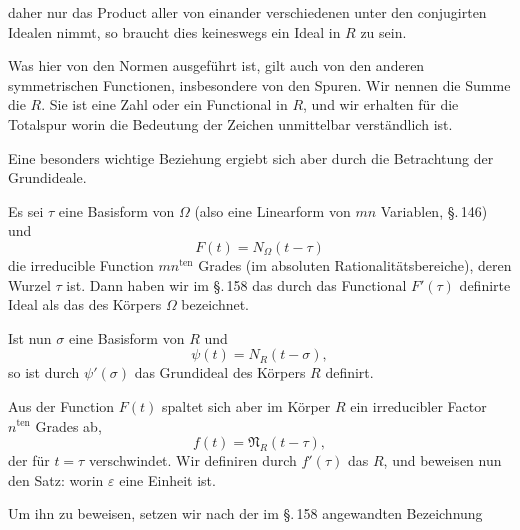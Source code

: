 daher nur das Product aller von einander verschiedenen unter den conjugirten Idealen nimmt, so braucht dies keineswegs ein Ideal in $R$ zu sein.

Was hier von den Normen ausgef\"uhrt ist, gilt auch von den anderen symmetrischen Functionen, insbesondere von den Spuren. Wir nennen die Summe
die  $R$. Sie ist eine Zahl oder ein Functional in $R$, und wir erhalten f\"ur die Totalspur
worin die Bedeutung der Zeichen unmittelbar verst\"andlich ist.

Eine besonders wichtige Beziehung ergiebt sich aber durch die Betrachtung der Grundideale.

Es sei $\tau$ eine Basisform von $\Omega$ (also eine Linearform von $mn$ Variablen, \S.\,146) und
\[
F(t) = N_\Omega(t - \tau)
\]
die irreducible Function $mn^{\text{ten}}$ Grades (im absoluten Rationalit\"atsbereiche), deren Wurzel $\tau$ ist. Dann haben wir im \S.\,158 das durch das Functional $F'(\tau)$ definirte Ideal als das  des K\"orpers $\Omega$ bezeichnet.

Ist nun $\sigma$ eine Basisform von $R$ und
\[
\psi(t) = N_R(t - \sigma),
\]
so ist durch $\psi'(\sigma)$ das Grundideal des K\"orpers $R$ definirt.

Aus der Function $F(t)$ spaltet sich aber im K\"orper $R$ ein irreducibler Factor $n^{\text{ten}}$ Grades ab,
\[
f(t) = \mathfrak{N}_R(t - \tau),
\]
der f\"ur $t = \tau$ verschwindet. Wir definiren durch $f'(\tau)$ das  $R$, und beweisen nun den Satz:
worin $\varepsilon$ eine Einheit ist.

Um ihn zu beweisen, setzen wir nach der im \S.\,158 angewandten Bezeichnung
